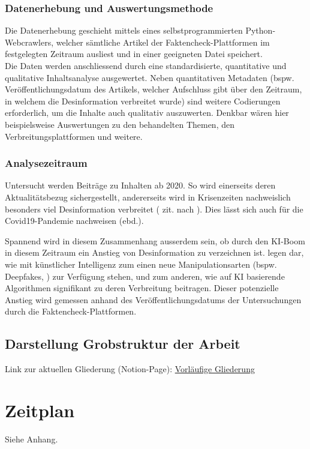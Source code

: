 \documentclass[12pt,a4paper]{article}        %
\begin{document}
\subsubsection{Datenerhebung und Auswertungsmethode}
Die Datenerhebung geschieht mittels eines selbstprogrammierten Python-Webcrawlers, welcher sämtliche Artikel der Faktencheck-Plattformen im festgelegten Zeitraum ausliest und in einer geeigneten Datei speichert. \\
Die Daten werden anschliessend durch eine standardisierte, quantitative und qualitative Inhaltsanalyse ausgewertet. Neben quantitativen Metadaten (bspw. Veröffentlichungsdatum des Artikels, welcher Aufschluss gibt über den Zeitraum, in welchem die Desinformation verbreitet wurde) sind weitere Codierungen erforderlich, um die Inhalte auch qualitativ auszuwerten. Denkbar wären hier beispielsweise Auswertungen zu den behandelten Themen, den Verbreitungsplattformen und weitere.

\subsubsection{Analysezeitraum}
Untersucht werden Beiträge zu Inhalten ab 2020. So wird einerseits deren Aktualitätsbezug sichergestellt, andererseits wird in Krisenzeiten nachweislich besonders viel Desinformation verbreitet (\textcite{tandoc_defining_2018} zit. nach \textcite[2]{ceron_fake_2021}). Dies lässt sich auch für die Covid19-Pandemie nachweisen (ebd.).

Spannend wird in diesem Zusammenhang ausserdem sein, ob durch den KI-Boom in diesem Zeitraum ein Anstieg von Desinformation zu verzeichnen ist. \textcite[e32-3]{bontridder_role_2021} legen dar, wie mit künstlicher Intelligenz zum einen neue Manipulationsarten (bspw. Deepfakes, ) zur Verfügung stehen, und zum anderen, wie auf KI basierende Algorithmen signifikant zu deren Verbreitung beitragen.
Dieser potenzielle Anstieg wird gemessen anhand des Veröffentlichungsdatums der Untersuchungen durch die Faktencheck-Plattformen.


\subsection{Darstellung Grobstruktur der Arbeit}
Link zur aktuellen Gliederung (Notion-Page): \href{https://yannix.notion.site/Vorl-ufige-Gliederung-132c91f07039801fb0e0ed859201268b}{Vorläufige Gliederung}

\section{Zeitplan}
Siehe Anhang.
\end{document}
